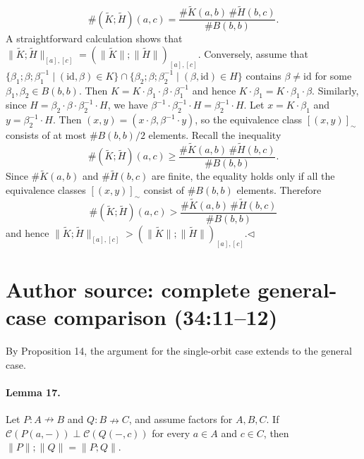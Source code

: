 \documentclass[10pt,a4paper]{article}
\newcommand{\pf}{\mathrel{\nrightarrow}}
\newcommand{\norm}[1]{\lVert#1\rVert}
\begin{document}
\[
\#(\widetilde K;\widetilde H)(a,c)=
\frac{\#\widetilde K(a,b)\,\#\widetilde H(b,c)}{\#B(b,b)}.
\]
A straightforward calculation shows that $\norm{\widetilde K;\widetilde H}_{[a],[c]}=(\norm{\widetilde K};\norm{\widetilde H})_{[a],[c]}$.
Conversely, assume that $\{\beta_1;\beta;\beta_1^{-1}\mid(\mathrm{id},\beta)\in K\}\cap\{\beta_2;\beta;\beta_2^{-1}\mid(\beta,\mathrm{id})\in H\}$ contains $\beta\ne\mathrm{id}$ for some $\beta_1,\beta_2\in B(b,b)$. Then $K=K\cdot\beta_1\cdot\beta\cdot\beta_1^{-1}$ and hence $K\cdot\beta_1=K\cdot\beta_1\cdot\beta$. Similarly, since $H=\beta_2\cdot\beta\cdot\beta_2^{-1}\cdot H$, we have $\beta^{-1}\cdot\beta_2^{-1}\cdot H=\beta_2^{-1}\cdot H$. Let $x=K\cdot\beta_1$ and $y=\beta_2^{-1}\cdot H$. Then $(x,y)=(x\cdot\beta,\beta^{-1}\cdot y)$, so the equivalence class $[(x,y)]_\sim$ consists of at most $\#B(b,b)/2$ elements. Recall the inequality
\[
\#(\widetilde K;\widetilde H)(a,c)\ge
\frac{\#\widetilde K(a,b)\,\#\widetilde H(b,c)}{\#B(b,b)}.
\]
Since $\#\widetilde K(a,b)$ and $\#\widetilde H(b,c)$ are finite, the equality holds only if all the equivalence classes $[(x,y)]_\sim$ consist of $\#B(b,b)$ elements. Therefore
\[
\#(\widetilde K;\widetilde H)(a,c)>
\frac{\#\widetilde K(a,b)\,\#\widetilde H(b,c)}{\#B(b,b)}
\]
and hence $\norm{\widetilde K;\widetilde H}_{[a],[c]}>(\norm{\widetilde K};\norm{\widetilde H})_{[a],[c]}$.\hfill$\triangleleft$
\section*{Author source: complete general-case comparison (34:11--12)}
By Proposition 14, the argument for the single-orbit case extends to the general case.
\paragraph{Lemma 17.} Let $P:A\pf B$ and $Q:B\pf C$, and assume factors for $A,B,C$. If $\mathcal C(P(a,-))\perp\mathcal C(Q(-,c))$ for every $a\in A$ and $c\in C$, then $\norm P;\norm Q=\norm{P;Q}$.
\end{document}
